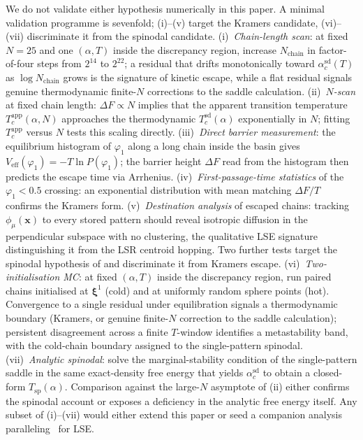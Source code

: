 \documentclass[11pt]{article}
\newcommand{\bxi}{\boldsymbol{\xi}}
\newcommand{\bx}{\bm{x}}
\newcommand{\acSd}{\alpha_c^{\mathrm{sd}}}
\begin{document}
We do not validate either hypothesis numerically in this paper. A minimal
validation programme is sevenfold; (i)--(v) target the Kramers candidate,
(vi)--(vii) discriminate it from the spinodal candidate. (i)~\emph{Chain-length scan}: at
fixed $N=25$ and one $(\alpha, T)$ inside the discrepancy region,
increase $N_{\mathrm{chain}}$ in factor-of-four steps from
$2^{14}$ to $2^{22}$; a residual that drifts monotonically toward
$\acSd(T)$ as $\log N_{\mathrm{chain}}$ grows is the signature of
kinetic escape, while a flat residual signals genuine thermodynamic
finite-$N$ corrections to the saddle calculation.
(ii)~\emph{$N$-scan} at fixed chain length: $\Delta F \propto N$
implies that the apparent transition temperature
$T_c^{\mathrm{app}}(\alpha, N)$ approaches the thermodynamic
$T_c^{\mathrm{sd}}(\alpha)$ exponentially in $N$; fitting
$T_c^{\mathrm{app}}$ versus $N$ tests this scaling directly.
(iii)~\emph{Direct barrier measurement}: the equilibrium histogram of
$\varphi_1$ along a long chain inside the basin gives
$V_{\mathrm{eff}}(\varphi_1) = -T \ln P(\varphi_1)$; the barrier
height $\Delta F$ read from the histogram then predicts the escape
time via Arrhenius.
(iv)~\emph{First-passage-time statistics} of the $\varphi_1 < 0.5$
crossing: an exponential distribution with mean matching
$\Delta F/T$ confirms the Kramers form.
(v)~\emph{Destination analysis} of escaped chains: tracking
$\phi_\mu(\bx)$ to every stored pattern should reveal isotropic
diffusion in the perpendicular subspace with no clustering, the
qualitative LSE signature distinguishing it from the LSR centroid
hopping.
Two further tests target the spinodal hypothesis of
 and discriminate it from Kramers escape.
(vi)~\emph{Two-initialisation MC}: at fixed $(\alpha, T)$ inside
the discrepancy region, run paired chains initialised at $\bxi^1$
(cold) and at uniformly random sphere points (hot). Convergence
to a single residual under equilibration signals a thermodynamic
boundary (Kramers, or genuine finite-$N$ correction to the saddle
calculation); persistent disagreement across a finite $T$-window
identifies a metastability band, with the cold-chain boundary
assigned to the single-pattern spinodal.
(vii)~\emph{Analytic spinodal}: solve the marginal-stability
condition of the single-pattern saddle in the same exact-density
free energy that yields $\acSd$ to obtain a closed-form
$T_{\mathrm{sp}}(\alpha)$. Comparison against the large-$N$
asymptote of (ii) either confirms the spinodal account or exposes
a deficiency in the analytic free energy itself.
Any subset of (i)--(vii) would either extend this paper or
seed a companion analysis paralleling~\citep{petrova2026metastable}
for LSE.
\end{document}
